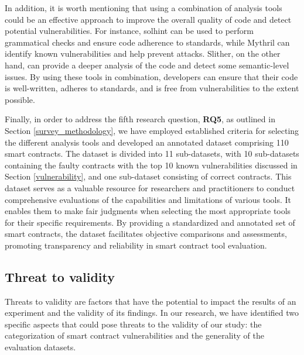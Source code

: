\documentclass[manuscript,screen]{acmart}
\begin{document}
In addition, it is worth mentioning that using a combination of analysis tools could be an effective approach to improve the overall quality of code and detect potential vulnerabilities. For instance, solhint can be used to perform grammatical checks and ensure code adherence to standards, while Mythril can identify known vulnerabilities and help prevent attacks. Slither, on the other hand, can provide a deeper analysis of the code and detect some semantic-level issues. By using these tools in combination, developers can ensure that their code is well-written, adheres to standards, and is free from vulnerabilities to the extent possible.

Finally, in order to address the fifth research question, \textbf{RQ5}, as outlined in Section \ref{survey_methodology}, we have employed established criteria for selecting the different analysis tools and developed an annotated dataset comprising 110 smart contracts. The dataset is divided into 11 sub-datasets, with 10 sub-datasets containing the faulty contracts with the top 10 known vulnerabilities discussed in Section \ref{vulnerability}, and one sub-dataset consisting of correct contracts. This dataset serves as a valuable resource for researchers and practitioners to conduct comprehensive evaluations of the capabilities and limitations of various tools. It enables them to make fair judgments when selecting the most appropriate tools for their specific requirements. By providing a standardized and annotated set of smart contracts, the dataset facilitates objective comparisons and assessments, promoting transparency and reliability in smart contract tool evaluation.

\subsection{Threat to validity}
Threats to validity are factors that have the potential to impact the results of an experiment and the validity of its findings. In our research, we have identified two specific aspects that could pose threats to the validity of our study: the categorization of smart contract vulnerabilities and the generality of the evaluation datasets.
\end{document}
